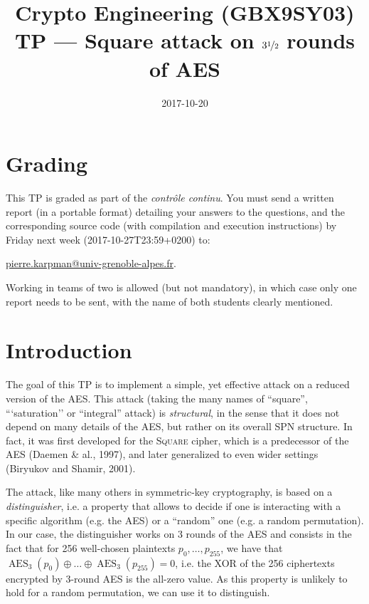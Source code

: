 \documentclass[a4paper,11pt]{article}
\title{Crypto Engineering (GBX9SY03)\\
TP --- Square attack on $3\nicefrac{1}{2}$ rounds of AES}
\date{2017-10-20}
\DeclareMathOperator\AES{AES}
\begin{document}
\maketitle{}

\section*{Grading}
This TP is graded as part of the \emph{contrôle continu}. You must send a written report (in a portable format) detailing
your answers to the questions, and the corresponding source code (with compilation and execution instructions)
by Friday next week (2017-10-27T23:59+0200) to:\\
\begin{center}
\href{mailto:pierre.karpman@univ-grenoble-alpes.fr}{pierre.karpman@univ-grenoble-alpes.fr}.
\end{center}
Working in teams of two is allowed (but not mandatory), in which case only one report needs to be sent, with the name of both
students clearly mentioned. 


\section*{Introduction}

The goal of this TP is to implement a simple, yet effective attack on a reduced version of the AES. This attack (taking the many names of
``square'', ```saturation'' or ``integral'' attack) is \emph{structural}, in the sense that it does not depend on many details of the AES,
but rather on its overall SPN structure. In fact, it was first developed for the \textsc{Square} cipher, which is a predecessor
of the AES (Daemen \& al., 1997), and later generalized to even wider settings (Biryukov and Shamir, 2001).

The attack, like many others in symmetric-key cryptography, is based on a \emph{distinguisher}, i.e. a property that allows to decide if
one is interacting with a specific algorithm (e.g. the AES) or a ``random'' one (e.g. a random permutation). In our case, the distinguisher
works on $3$ rounds of the AES and consists in the fact that for 256 well-chosen plaintexts $p_{0},\ldots,p_{255}$,
we have that $\AES_3(p_0) \oplus \ldots \oplus \AES_3(p_{255}) = 0$, i.e. the XOR of the 256 ciphertexts encrypted by 3-round AES is the all-zero value.
As this property is unlikely to hold for a random permutation, we can use it to distinguish.
\end{document}
